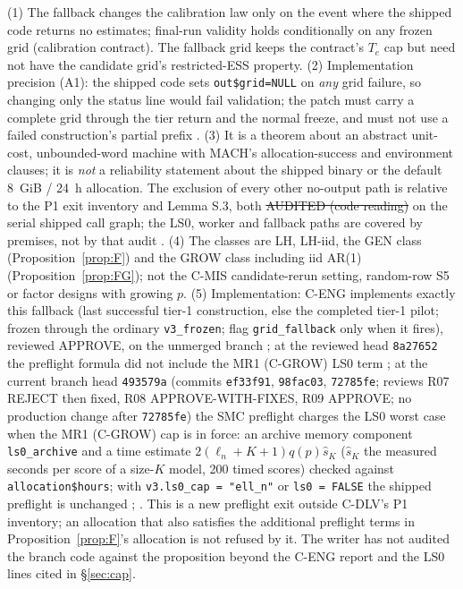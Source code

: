 \begin{remark}
(1) The fallback changes the calibration law only on the event where the shipped code returns no estimates; final-run validity holds conditionally on any frozen grid (calibration contract). The fallback grid keeps the contract's $T_e$ cap but need not have the candidate grid's restricted-ESS property. (2) Implementation precision (A1): the shipped code sets \texttt{out\$grid=NULL} on \emph{any} grid failure, so changing only the status line would fail validation; the patch must carry a complete grid through the tier return and the normal freeze, and must not use a failed construction's partial prefix . (3) It is a theorem about an abstract unit-cost, unbounded-word machine with MACH's allocation-success and environment clauses; it is \emph{not} a reliability statement about the shipped binary or the default 8~GiB / 24~h allocation. The exclusion of every other no-output path is relative to the P1 exit inventory and Lemma S.3, both \st{AUDITED (code reading)} on the serial shipped call graph; the LS0, worker and fallback paths are covered by premises, not by that audit . (4) The classes are LH, LH-iid, the GEN class (Proposition~\ref{prop:F}) and the GROW class including iid AR(1) (Proposition~\ref{prop:FG}); not the C-MIS candidate-rerun setting, random-row S5 or factor designs with growing $p$. (5) Implementation: C-ENG implements exactly this fallback (last successful tier-1 construction, else the completed tier-1 pilot; frozen through the ordinary \texttt{v3\_frozen}; flag \texttt{grid\_fallback} only when it fires), reviewed APPROVE, on the unmerged branch ; at the reviewed head \texttt{8a27652} the preflight formula did not include the MR1 (C-GROW) LS0 term ; at the current branch head \texttt{493579a} (commits \texttt{ef33f91}, \texttt{98fac03}, \texttt{72785fe}; reviews R07 REJECT then fixed, R08 APPROVE-WITH-FIXES, R09 APPROVE; no production change after \texttt{72785fe}) the SMC preflight charges the LS0 worst case when the MR1 (C-GROW) cap is in force: an archive memory component \texttt{ls0\_archive} and a time estimate $2(\ell_n+K+1)q(p)\hat s_K$ ($\hat s_K$ the measured seconds per score of a size-$K$ model, 200 timed scores) checked against \texttt{allocation\$hours}; with \texttt{v3.ls0\_cap = "ell\_n"} or \texttt{ls0 = FALSE} the shipped preflight is unchanged ; . This is a new preflight exit outside C-DLV's P1 inventory; an allocation that also satisfies the additional preflight terms in Proposition~\ref{prop:F}'s allocation is not refused by it. The writer has not audited the branch code against the proposition beyond the C-ENG report and the LS0 lines cited in §\ref{sec:cap}.
\end{remark}

